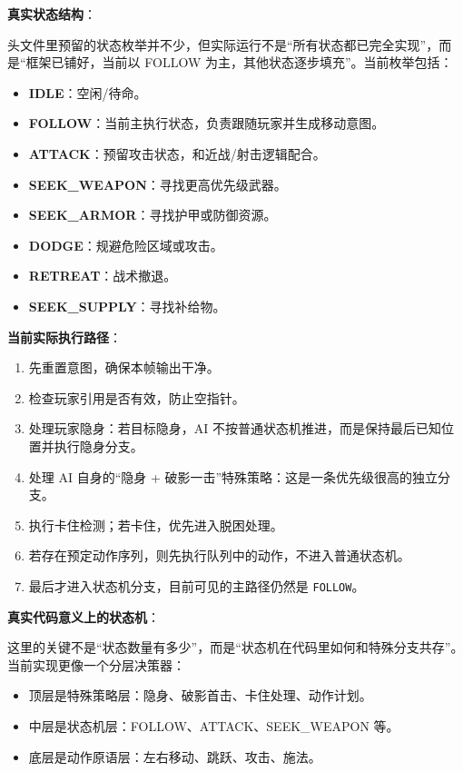 ﻿\documentclass[utf8]{ctexart}
\begin{document}
\textbf{真实状态结构}：

头文件里预留的状态枚举并不少，但实际运行不是“所有状态都已完全实现”，而是“框架已铺好，当前以 FOLLOW 为主，其他状态逐步填充”。当前枚举包括：

\begin{itemize}
  \item \textbf{IDLE}：空闲/待命。
  \item \textbf{FOLLOW}：当前主执行状态，负责跟随玩家并生成移动意图。
  \item \textbf{ATTACK}：预留攻击状态，和近战/射击逻辑配合。
  \item \textbf{SEEK\_WEAPON}：寻找更高优先级武器。
  \item \textbf{SEEK\_ARMOR}：寻找护甲或防御资源。
  \item \textbf{DODGE}：规避危险区域或攻击。
  \item \textbf{RETREAT}：战术撤退。
  \item \textbf{SEEK\_SUPPLY}：寻找补给物。
\end{itemize}

\textbf{当前实际执行路径}：

\begin{enumerate}
  \item 先重置意图，确保本帧输出干净。
  \item 检查玩家引用是否有效，防止空指针。
  \item 处理玩家隐身：若目标隐身，AI 不按普通状态机推进，而是保持最后已知位置并执行隐身分支。
  \item 处理 AI 自身的“隐身 + 破影一击”特殊策略：这是一条优先级很高的独立分支。
  \item 执行卡住检测；若卡住，优先进入脱困处理。
  \item 若存在预定动作序列，则先执行队列中的动作，不进入普通状态机。
  \item 最后才进入状态机分支，目前可见的主路径仍然是 \texttt{FOLLOW}。
\end{enumerate}

\textbf{真实代码意义上的状态机}：

这里的关键不是“状态数量有多少”，而是“状态机在代码里如何和特殊分支共存”。当前实现更像一个分层决策器：

\begin{itemize}
  \item 顶层是特殊策略层：隐身、破影首击、卡住处理、动作计划。
  \item 中层是状态机层：FOLLOW、ATTACK、SEEK\_WEAPON 等。
  \item 底层是动作原语层：左右移动、跳跃、攻击、施法。
\end{itemize}
\end{document}
